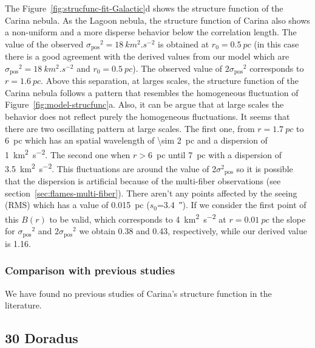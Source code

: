 \documentclass[fleqn,usenatbib, useAMS, a4paper]{mnras}
\newcommand\pos{\ensuremath{_{\mathrm{pos}}}}
\begin{document}
The Figure~\ref{fig:strucfunc-fit-Galactic}d shows the structure function of the Carina nebula.
As the Lagoon nebula, the structure function of Carina also shows a non-uniform and a more disperse behavior below the correlation length.
The value of the observed \(\sigma\pos^2 = \SI{18}{km^{2}.s^{-2}}\) is obtained at \(r_0 = \SI{0.5}{pc} \) (in this case there is a good agreement with the derived values from our model which are \(\sigma\pos^2 = \SI{18}{km^{2}.s^{-2}}\) and \(r_0 = \SI{0.5}{pc} \)).
The observed value of \(2\sigma\pos^2\) corresponds to \(r = \SI{1.6}{pc} \).
Above this separation, at larges scales, the structure function of the Carina nebula follows a pattern that resembles the homogeneous fluctuation of Figure~\ref{fig:model-strucfunc}a.
Also, it can be argue that at large scales the behavior does not reflect purely the homogeneous fluctuations. 
It seems that there are two  oscillating pattern at large scales.
The first one, from \(r = \SI{1.7}{pc} \) to \SI{6}{pc} which has an spatial wavelength of \SI{\sim 2}{pc} and a dispersion of \SI{1}{km^{2}.s^{-2}}.
The second one when \(r >\)\SI{6}{pc} until \SI{7}{pc} with a dispersion of \SI{3.5}{km^{2}.s^{-2}}.
This fluctuations are around the value of 2\(\sigma^2\pos\) so it is possible that the dispersion is artificial because of the multi-fiber observations (see section~\ref{sec:flames-multi-fiber}).
There aren't any points affected by the seeing (RMS) which has a value of \SI{0.015}{pc} (\(s_0\)=\SI{3.4}{\arcsecond}).
If we consider the first point of this \(B(r)\) to be valid, which corresponds to \SI{4}{km^{2}.s^{-2}} at \(r = \SI{0.01}{pc} \) the slope for \(\sigma\pos^2\) and \(2\sigma\pos^2\) we obtain \num{0.38} and \num{0.43}, respectively, while our derived value is \num{1.16}.

\subsubsection{Comparison with previous studies}
\label{sec:comparison-carina}

We have found no previous studies of Carina's structure function in the literature.

\subsection{30 Doradus}
\label{sec:30-doradus}
\end{document}
